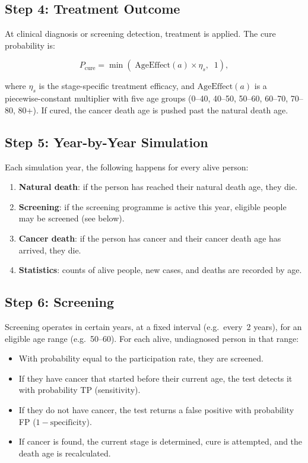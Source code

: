 \documentclass[12pt,a4paper]{article}
\begin{document}
\subsection{Step 4: Treatment Outcome}

At clinical diagnosis or screening detection, treatment is applied. The cure probability is:

\begin{equation}
    P_{\text{cure}} = \min\left( \; \text{AgeEffect}(a) \times \eta_s, \;\; 1 \right),
\end{equation}

where $\eta_s$ is the stage-specific treatment efficacy, and $\text{AgeEffect}(a)$ is a piecewise-constant multiplier with five age groups (0--40, 40--50, 50--60, 60--70, 70--80, 80+). If cured, the cancer death age is pushed past the natural death age.

\subsection{Step 5: Year-by-Year Simulation}

Each simulation year, the following happens for every alive person:

\begin{enumerate}[nosep]
    \item \textbf{Natural death}: if the person has reached their natural death age, they die.
    \item \textbf{Screening}: if the screening programme is active this year, eligible people may be screened (see below).
    \item \textbf{Cancer death}: if the person has cancer and their cancer death age has arrived, they die.
    \item \textbf{Statistics}: counts of alive people, new cases, and deaths are recorded by age.
\end{enumerate}

\subsection{Step 6: Screening}

Screening operates in certain years, at a fixed interval (e.g.\ every~2 years), for an eligible age range (e.g.\ 50--60). For each alive, undiagnosed person in that range:

\begin{itemize}[nosep]
    \item With probability equal to the participation rate, they are screened.
    \item If they have cancer that started before their current age, the test detects it with probability TP (sensitivity).
    \item If they do not have cancer, the test returns a false positive with probability FP ($1 - \text{specificity}$).
    \item If cancer is found, the current stage is determined, cure is attempted, and the death age is recalculated.
\end{itemize}
\end{document}
